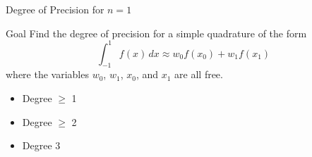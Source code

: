 \documentclass[10pt]{beamer}
\begin{document}
\begin{frame}{Degree of Precision for $n=1$}

\begin{block}{Goal}
    Find the degree of precision for a simple quadrature of the form
        $$\int_{-1}^1 f(x)\,dx \approx w_0 f(x_0) + w_1 f(x_1) $$
    where the variables $w_0$, $w_1$, $x_0$, and $x_1$ are all free.
\end{block}

\begin{itemize}
\item \textcolor{blue}{\checkmark} Degree $\ge$ 1
\item \textcolor{blue}{\checkmark} Degree $\ge$ 2
\item Degree 3
\end{itemize}


\end{frame}
\end{document}
